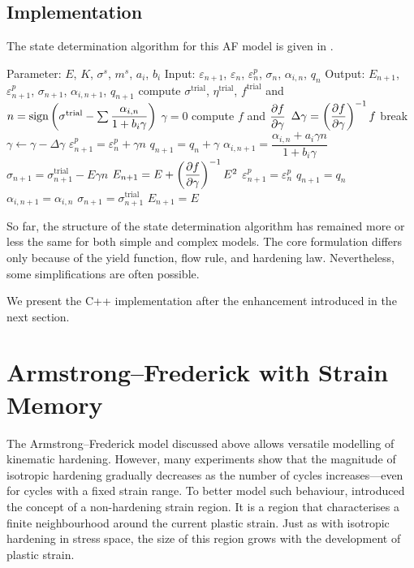 \subsection{Implementation}
The state determination algorithm for this AF model is given in .
\begin{breakablealgorithm}
\caption{state determination of uniaxial AF steel model}\label{algo:af_steel}
\begin{algorithmic}[1]
\State Parameter: $E$, $K$, $\sigma^s$, $m^s$, $a_i$, $b_i$
\State Input: $\varepsilon_{n+1}$, $\varepsilon_n$, $\varepsilon^p_n$, $\sigma_n$, $\alpha_{i,n}$, $q_n$
\State Output: $E_{n+1}$, $\varepsilon^p_{n+1}$, $\sigma_{n+1}$, $\alpha_{i,n+1}$, $q_{n+1}$
\State compute $\sigma^\text{trial}$, $\eta^\text{trial}$, $f^\text{trial}$ and $n=\text{sign}\left(\sigma^\text{trial}-\sum\dfrac{\alpha_{i,n}}{1+b_i\gamma}\right)$
\State $\gamma=0$
\State compute $f$ and $\dfrac{\partial{f}}{\partial{\gamma}}$
\State $\Delta\gamma=\left(\dfrac{\partial{f}}{\partial{\gamma}}\right)^{-1}f$
\State break
\EndIf
\State $\gamma\leftarrow\gamma-\Delta\gamma$
\EndWhile
\State $\varepsilon^p_{n+1}=\varepsilon^p_n+\gamma{}n$
\State $q_{n+1}=q_n+\gamma$
\State $\alpha_{i,n+1}=\dfrac{\alpha_{i,n}+a_i\gamma{}n}{1+b_i\gamma}$
\State $\sigma_{n+1}=\sigma_{n+1}^\text{trial}-E\gamma{}n$
\State $E_{n+1}=E+\left(\dfrac{\partial{f}}{\partial{\gamma}}\right)^{-1}E^2$
\Else
\State $\varepsilon^p_{n+1}=\varepsilon^p_n$
\State $q_{n+1}=q_n$
\State $\alpha_{i,n+1}=\alpha_{i,n}$
\State $\sigma_{n+1}=\sigma_{n+1}^\text{trial}$
\State $E_{n+1}=E$
\EndIf
\end{algorithmic}
\end{breakablealgorithm}

So far, the structure of the state determination algorithm has remained more or less the same for both simple and complex models.
The core formulation differs only because of the yield function, flow rule, and hardening law.
Nevertheless, some simplifications are often possible.

We present the C++ implementation after the enhancement introduced in the next section.
\section{Armstrong--Frederick with Strain Memory}
The Armstrong--Frederick model discussed above allows versatile modelling of kinematic hardening.
However, many experiments show that the magnitude of isotropic hardening gradually decreases as the number of cycles increases---even for cycles with a fixed strain range.
To better model such behaviour, \cite{Ohno1982} introduced the concept of a non-hardening strain region.
It is a region that characterises a finite neighbourhood around the current plastic strain.
Just as with isotropic hardening in stress space, the size of this region grows with the development of plastic strain.
